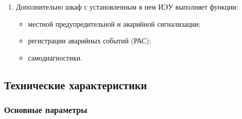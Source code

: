 \begin{enumerate}[label=\arabic{section}.\arabic{subsection}.\arabic*, align=left, labelsep=4pt, leftmargin=0pt, itemindent=2cm]
\item
Дополнительно шкаф с установленным в нем ИЭУ выполняет функции:
\begin{itemize}
\item местной предупредительной и аварийной сигнализации;
\item регистрации аварийных событий (РАС);
\item самодиагностики.
\end{itemize}

\end{enumerate}


\color{unidarkgreen}\subsection{Технические характеристики}\color{black}
\subsubsection{Основные параметры}

